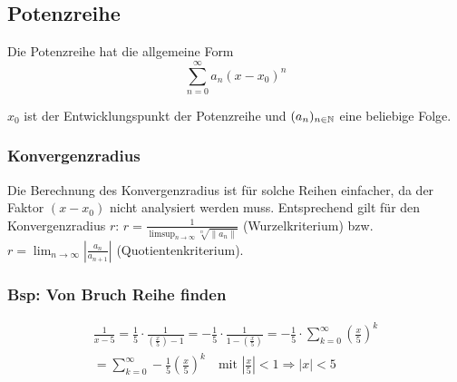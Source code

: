 \subsection{Potenzreihe}
Die Potenzreihe hat die allgemeine Form
\[
\sum_{n=0}^\infty a_n (x - x_0)^n
\]

$x_0$ ist der Entwicklungspunkt der Potenzreihe und $(a_n)_{n \in \mathbb{N}}$ eine
beliebige Folge.

\subsubsection{Konvergenzradius}
Die Berechnung des Konvergenzradius ist für solche Reihen einfacher, da der
Faktor $(x - x_0)$ nicht analysiert werden muss. Entsprechend gilt für den
Konvergenzradius $r$:
$r = \frac{1}{\limsup_{n\to\infty} \sqrt[n]{\|a_n\|}}$ (Wurzelkriterium) bzw.
$r = \lim_{n\to\infty} \left | \frac{a_n}{a_{n+1}} \right |$
(Quotientenkriterium).

\subsubsection{Bsp: Von Bruch Reihe finden}
\begin{gather*}
	\frac{1}{x-5} = \frac{1}{5} \cdot \frac{1}{(\frac{x}{5})-1} 
	= - \frac{1}{5} \cdot \frac{1}{1-(\frac{x}{5})}
	= - \frac{1}{5} \cdot \sum_{k=0}^{\infty}(\frac{x}{5})^k \\
	= \sum_{k=0}^\infty - \frac{1}{5} (\frac{x}{5})^k
	\quad \text{mit } |\frac{x}{5}| < 1 \Rightarrow |x| < 5
\end{gather*}
